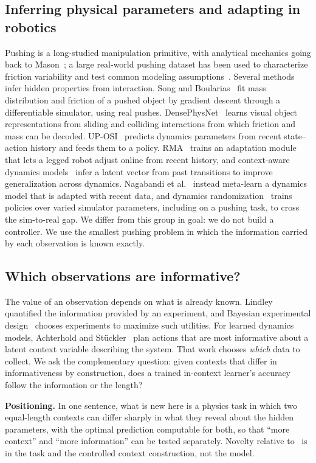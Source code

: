 \documentclass{article}
\begin{document}
\subsection{Inferring physical parameters and adapting in robotics}
Pushing is a long-studied manipulation primitive, with analytical mechanics going back to Mason~\cite{mason1986}; a large real-world pushing dataset has been used to characterize friction variability and test common modeling assumptions~\cite{yu2016}. Several methods infer hidden properties from interaction. Song and Boularias~\cite{song2020} fit mass distribution and friction of a pushed object by gradient descent through a differentiable simulator, using real pushes. DensePhysNet~\cite{xu2019} learns visual object representations from sliding and colliding interactions from which friction and mass can be decoded. UP-OSI~\cite{yu2017} predicts dynamics parameters from recent state--action history and feeds them to a policy. RMA~\cite{kumar2021} trains an adaptation module that lets a legged robot adjust online from recent history, and context-aware dynamics models~\cite{lee2020} infer a latent vector from past transitions to improve generalization across dynamics. Nagabandi et al.~\cite{nagabandi2018} instead meta-learn a dynamics model that is adapted with recent data, and dynamics randomization~\cite{peng2017} trains policies over varied simulator parameters, including on a pushing task, to cross the sim-to-real gap. We differ from this group in goal: we do not build a controller. We use the smallest pushing problem in which the information carried by each observation is known exactly.

\subsection{Which observations are informative?}
The value of an observation depends on what is already known. Lindley~\cite{lindley1956} quantified the information provided by an experiment, and Bayesian experimental design~\cite{chaloner1995} chooses experiments to maximize such utilities. For learned dynamics models, Achterhold and St\"uckler~\cite{achterhold2021} plan actions that are most informative about a latent context variable describing the system. That work chooses \emph{which} data to collect. We ask the complementary question: given contexts that differ in informativeness by construction, does a trained in-context learner's accuracy follow the information or the length?

\textbf{Positioning.} In one sentence, what is new here is a physics task in which two equal-length contexts can differ sharply in what they reveal about the hidden parameters, with the optimal prediction computable for both, so that ``more context'' and ``more information'' can be tested separately. Novelty relative to~\cite{garg2022} is in the task and the controlled context construction, not the model.
\end{document}
